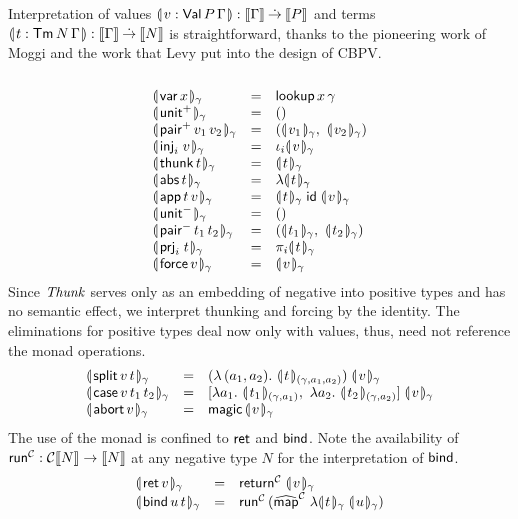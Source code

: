 \documentclass[sigplan,screen,fleqn,review]{acmart} %
\begin{document}
Interpretation of values
$\denty{ v : \PValTm P \Gamma } : \den \Gamma \todot \den P$
and terms
$\denty{ t : \Tm N \Gamma } : \den \Gamma \todot \den N$
is straightforward, thanks to the pioneering work of
Moggi \cite{moggi:infcomp91} and the work that
Levy \cite{levy:hosc06}
put into the design of CBPV.
\[
\begin{array}{lcl}
  \\
  \dent{\tvar\,x}\gamma & = & \tlookup\,x\,\gamma \\
  \dent{\punit}\gamma   & = & \ttempty \\
  \dent{\ppair\,v_1\,v_2}\gamma & = &
    (\dent{v_1}\gamma,\ \dent{v_2}\gamma) \\
  \dent{\inj i v}\gamma & = & \iota_i \dent v \gamma \\
  \dent{\tthunk\,t}\gamma & = & \dent t \gamma \\
  \dent{\tabs\,t}\gamma
      & = & \fdent t \gamma \\
  \dent{\tapp\,t\,v} \gamma & = &
     \dent t \gamma\;\tid\;\dent v \gamma \\
  \dent{\nunit}\gamma & = & \ttempty \\
  \dent{\npair\,t_1\,t_2}\gamma & = &
    (\dent{t_1}\gamma,\ \dent{t_2}\gamma) \\
  \dent{\prj i t}\gamma & = & \pi_i \dent t \gamma \\
  \dent{\tforce\,v}\gamma & = & \dent v \gamma \\
\end{array}
\]
Since $\tThunk$ serves only as an embedding of negative into positive
types and has no semantic effect,
we interpret thunking and forcing by the identity.
The eliminations for positive types deal now only with values, thus,
need not reference the monad operations.
\[
\begin{array}{lcl}
  \dent{\tsplit\,v\,t}\gamma & = & (\lambda\,(a_1,a_2).\
    \dent{t}{(\gamma,a_1,a_2)} ) \; \dent v \gamma \\
  \dent{\tcase\,v\,t_1\,t_2}\gamma & = &
    [  \lambda a_1.\ \dent{t_1}{(\gamma,a_1)}
    ,\ \lambda a_2.\ \dent{t_2}{(\gamma,a_2)}
    ]\; \dent v \gamma \\
  \dent{\tabort\,v}\gamma & = & \tmagic\,\dent v \gamma \\
\end{array}
\]
The use of the monad is confined to $\tret$ and $\tbind$.
Note the availability of $\trun^\C : \C \den N \to \den N$
at any negative type $N$ for the interpretation of $\tbind$.
\[
\begin{array}{lcl}
  \dent{\tret\,v}\gamma & = & \treturn[\C] \; \dent v \gamma \\
  \dent{\tbind\,u\,t}\gamma & = & \trun^\C\,
    (\stmap[\C] \; \fdent t \gamma\; \dent u \gamma) \\
\end{array}
\]
\end{document}
